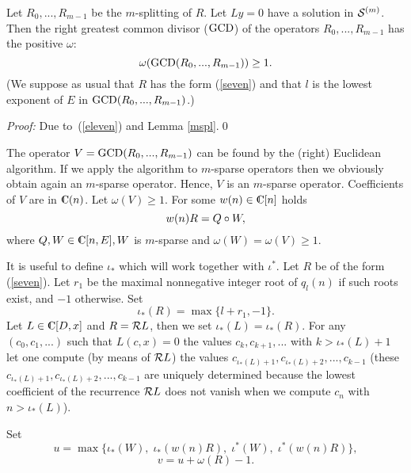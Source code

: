\begin{Theorem}
Let $R_0,...,R_{m-1}$ be the $m$-splitting of $R$. Let $Ly=0$ have
a solution in ${\cal S}^{(m)}$. Then the right greatest common divisor
($\mathop{\rm GCD}$) of the operators $R_0,...,R_{m-1}$ has the positive
$\omega$:
\begin{equation}
\label{14}
\omega ( \mathop{\rm GCD}(R_0,...,R_{m-1}))\ge 1.
\end{equation}
(We suppose as usual that $R$ has the form
(\ref{seven}) and that $l$ is the lowest exponent of $E$ in
$\mathop{\rm GCD}(R_0,...,R_{m-1})$.)
\end{Theorem}
{\em Proof:\/}
Due to~(\ref{eleven}) and Lemma \ref{mspl}.\qed

The operator $V=\mathop{\rm GCD}(R_0,...,R_{m-1})$ can be found by the (right)
Euclidean algorithm. If we apply the algorithm to $m$-sparse
operators then we obviously obtain again an $m$-sparse operator.
Hence, $V$ is an $m$-sparse operator. Coefficients of $V$ are in $\complex(n)$.
Let $\omega (V)\geq 1$.
For some $w(n)\in \complex [n]$ holds
$$w(n)R=Q\circ W,$$
where $Q,W\in \complex [n,E],W$ is $m$-sparse and $\omega (W)=\omega
(V) \geq 1$.

It is useful to define  $\iota _*$ which will work together
with $\iota ^*$.
Let $R$ be of the form (\ref{seven}).
Let $r_1$ be the maximal nonnegative integer root of $q_l(n)$ if
such roots exist, and $-1$ otherwise. Set
$$\iota _* (R)= \max \{l+r_1,-1\}.$$
Let $L \in \rodtp$ and $R= {\cal R} L$, then we set
$\iota _*(L)= \iota _*(R)$.
For any $(c_0,c_1,...)$ such that $L(c,x)=0$ the values
$c_k,c_{k+1},...$ with $k>\iota _*(L)+1$
let one compute (by means of ${\cal R} L$) the
values $c_{\iota _*(L)+1}, c_{\iota _*(L)+2},...,c_{k-1}$
(these
$c_{\iota _*(L)+1}, c_{\iota _*(L)+2},...,c_{k-1}$
are uniquely determined  because the lowest
coefficient of the recurrence ${\cal R} L$ does not vanish when we
compute $c_n$ with $n>\iota _*(L)$).

Set
$$u=\max \{\iota _* (W),\; \iota _*(w(n)R),\;
\iota ^*(W),\;\iota ^*(w(n)R)\},$$
$$v=u+\omega (R)-1.$$

